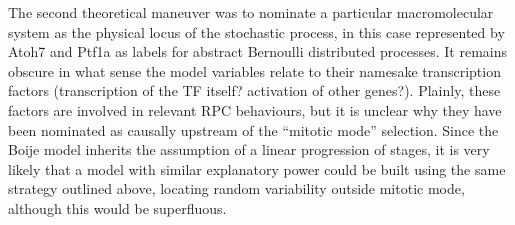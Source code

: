 The second theoretical maneuver was to nominate a particular macromolecular system as the physical locus of the stochastic process, in this case represented by Atoh7 and Ptf1a as labels for abstract Bernoulli distributed processes. It remains obscure in what sense the model variables relate to their namesake transcription factors (transcription of the TF itself? activation of other genes?). Plainly, these factors are involved in relevant RPC behaviours, but it is unclear why they have been nominated as causally upstream of the ``mitotic mode'' selection. Since the Boije model inherits the assumption of a linear progression of stages, it is very likely that a model with similar explanatory power could be built using the same strategy outlined above, locating random variability outside mitotic mode, although this would be superfluous.

